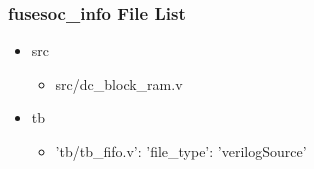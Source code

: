 \subsubsection{fusesoc\_info File List}
\begin{itemize}
\item src
	\begin{itemize}
	\item src/dc\_block\_ram.v
	\end{itemize}
\item tb
	\begin{itemize}
	\item {'tb/tb\_fifo.v': {'file\_type': 'verilogSource'}}
	\end{itemize}
\end{itemize}
